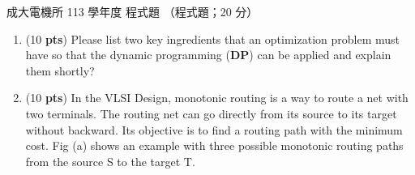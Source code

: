 \begin{pastexam}[label={px:ncku-113-ee-19}]{成大電機所 113 學年度 程式題}
（程式題；20 分）

\begin{enumerate}[label=\alph*.]
\item (10 \textbf{pts}) Please list two key ingredients that an optimization problem must have so
that the dynamic programming (\textbf{DP}) can be applied and explain them shortly?

\item (10 \textbf{pts}) In the VLSI Design, monotonic routing is a way to route a net with two
terminals. The routing net can go directly from its source to its target without backward. Its
objective is to find a routing path with the minimum cost. Fig (a) shows an example with three
possible monotonic routing paths from the source S to the target T.


\end{enumerate}
\end{pastexam}
